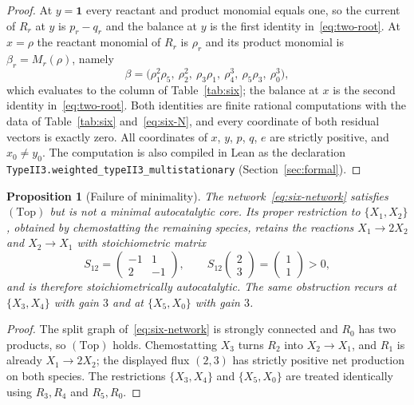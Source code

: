 \documentclass[11pt,reqno]{amsart}
\theoremstyle{plain}
\newtheorem{proposition}[theorem]{Proposition}
\theoremstyle{definition}
\theoremstyle{remark}
\numberwithin{equation}{section}
\newcommand{\Top}{\mathrm{(Top)}}
\newcommand{\one}{\mathbf{1}}
\begin{document}
\begin{proof}
At $y=\one$ every reactant and product monomial equals one, so the current of $R_r$ at $y$ is $p_r-q_r$ and the balance at $y$ is the first identity in~\eqref{eq:two-root}.  At $x=\rho$ the reactant monomial of $R_r$ is $\rho_r$ and its product monomial is $\beta_r=M_r(\rho)$, namely
\[
\beta=\bigl(\rho_1^2\rho_5,\ \rho_2^2,\ \rho_3\rho_1,\ \rho_4^3,\ \rho_5\rho_3,\ \rho_0^3\bigr),
\]
which evaluates to the column of Table~\ref{tab:six}; the balance at $x$ is the second identity in~\eqref{eq:two-root}.  Both identities are finite rational computations with the data of Table~\ref{tab:six} and~\eqref{eq:six-N}, and every coordinate of both residual vectors is exactly zero.  All coordinates of $x$, $y$, $p$, $q$, $e$ are strictly positive, and $x_0\ne y_0$.  The computation is also compiled in Lean as the declaration \texttt{TypeII3.weighted\_typeII3\_multistationary} (Section~\ref{sec:formal}).
\end{proof}

\begin{proposition}[Failure of minimality]\label{prop:six-nonminimal}
The network~\eqref{eq:six-network} satisfies $\Top$ but is not a minimal autocatalytic core.  Its proper restriction to $\{X_1,X_2\}$, obtained by chemostatting the remaining species, retains the reactions $X_1\to2X_2$ and $X_2\to X_1$ with stoichiometric matrix
\[
S_{12}=\begin{pmatrix}-1&1\\ 2&-1\end{pmatrix},\qquad S_{12}\begin{pmatrix}2\\3\end{pmatrix}=\begin{pmatrix}1\\1\end{pmatrix}>0,
\]
and is therefore stoichiometrically autocatalytic.  The same obstruction recurs at $\{X_3,X_4\}$ with gain $3$ and at $\{X_5,X_0\}$ with gain $3$.
\end{proposition}

\begin{proof}
The split graph of~\eqref{eq:six-network} is strongly connected and $R_0$ has two products, so $\Top$ holds.  Chemostatting $X_3$ turns $R_2$ into $X_2\to X_1$, and $R_1$ is already $X_1\to2X_2$; the displayed flux $(2,3)$ has strictly positive net production on both species.  The restrictions $\{X_3,X_4\}$ and $\{X_5,X_0\}$ are treated identically using $R_3,R_4$ and $R_5,R_0$.
\end{proof}
\end{document}
